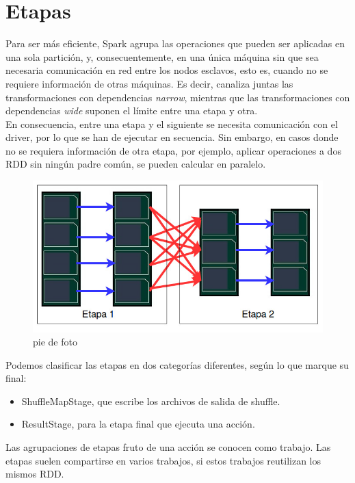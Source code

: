 \section{Etapas}
Para ser más eficiente, Spark agrupa las operaciones que pueden ser aplicadas en una sola partición, y, consecuentemente, en una única máquina sin que sea necesaria comunicación en red entre los nodos esclavos, esto es, cuando no se requiere información de otras máquinas. Es decir, canaliza juntas las transformaciones con dependencias \textit{narrow}, mientras que las transformaciones con dependencias \textit{wide} suponen el límite entre una etapa y otra.\\

En consecuencia, entre una etapa y el siguiente se necesita comunicación con el driver, por lo que se han de ejecutar en secuencia. Sin embargo, en casos donde no se requiera información de otra etapa, por ejemplo, aplicar operaciones a dos RDD sin ningún padre común, se pueden calcular en paralelo.\\

\begin{figure}[H]
	\includegraphics[scale=0.6]{img/etapas} 
	\centering
	\caption{pie de foto}
	\label{foto}
\end{figure}

Podemos clasificar las etapas en dos categorías diferentes, según lo que marque su final:\\

\begin{itemize}
\item ShuffleMapStage, que escribe los archivos de salida de shuffle.
\item ResultStage, para la etapa final que ejecuta una acción.
\end{itemize}

Las agrupaciones de etapas fruto de una acción se conocen como trabajo. Las etapas suelen compartirse en varios trabajos, si estos trabajos reutilizan los mismos RDD.\\

